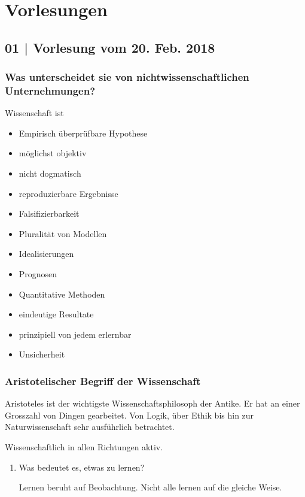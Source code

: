 \documentclass[11pt]{article}
\begin{document}
\section{Vorlesungen}
\label{sec-3}

\subsection{01 | Vorlesung vom 20. Feb. 2018}
\label{sec-3-1}

\subsubsection{Was unterscheidet sie von nichtwissenschaftlichen Unternehmungen?}
\label{sec-3-1-1}

Wissenschaft ist

\begin{itemize}
\item Empirisch überprüfbare Hypothese
\item möglichst objektiv
\item nicht dogmatisch
\item reproduzierbare Ergebnisse
\item Falsifizierbarkeit
\item Pluralität von Modellen
\item Idealisierungen
\item Prognosen
\item Quantitative Methoden
\item eindeutige Resultate
\item prinzipiell von jedem erlernbar
\item Unsicherheit
\end{itemize}

\subsubsection{Aristotelischer Begriff der Wissenschaft}
\label{sec-3-1-2}

Aristoteles ist der wichtigste Wissenschaftsphilosoph der Antike. Er hat an
einer Grosszahl von Dingen gearbeitet. Von Logik, über Ethik bis hin zur
Naturwissenschaft sehr ausführlich betrachtet.

Wissenschaftlich in allen Richtungen aktiv.

\begin{enumerate}
\item Was bedeutet es, etwas zu lernen?
\label{sec-3-1-2-1}

Lernen beruht auf Beobachtung. Nicht alle lernen auf die gleiche Weise.
\end{enumerate}
\end{document}
